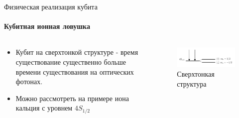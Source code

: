 \documentclass{beamer}
\begin{document}




    
    \begin{frame}{Физическая реализация кубита}
    \framesubtitle{Кубитная ионная ловушка}

    \begin{columns}

    \begin{column}{0.5\textwidth}

        \begin{itemize}
                \item Кубит на сверхтонкой структуре - время существование существенно больше времени существования на оптических фотонах.
                \item Можно рассмотреть на примере иона кальция с уровнем $4S_{1/2}$
        \end{itemize}

    \end{column}

    \begin{column}{0.5\textwidth}

        \begin{figure}
            \centering
            \includegraphics[width=\textwidth]{media/hyperfine-structure.png}
            \caption{Сверхтонкая структура}
        \end{figure}

    \end{column}

    \end{columns}

    \end{frame}
\end{document}
